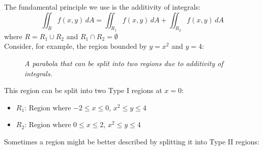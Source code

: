 \noindent The fundamental principle we use is the additivity of integrals:
\[
\iint_R f(x,y) \,dA = \iint_{R_1} f(x,y) \,dA + \iint_{R_2} f(x,y) \,dA
\]
where $R = R_1 \cup R_2$ and $R_1 \cap R_2 = \emptyset$ \\

\noindent Consider, for example, the region bounded by $y = x^2$ and $y = 4$:

\begin{figure}[H]
\begin{center}
\end{center}
\caption{\textit{A parabola that can be split into two regions due to additivity of integrals.}}
\end{figure}

\noindent This region can be split into two Type I regions at $x = 0$:

\begin{itemize}
    \item $R_1$: Region where $-2 \leq x \leq 0$, $x^2 \leq y \leq 4$
    \item $R_2$: Region where $0 \leq x \leq 2$, $x^2 \leq y \leq 4$
\end{itemize}

\noindent Sometimes a region might be better described by splitting it into Type II regions:

